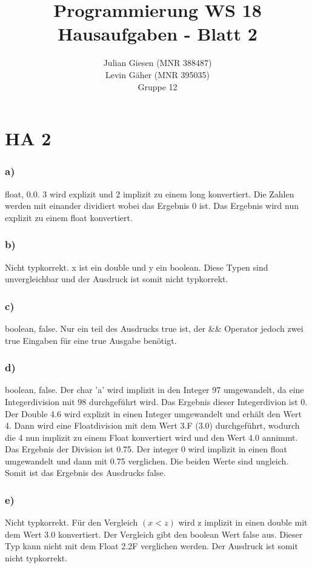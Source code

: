 \documentclass[a4paper]{article}
\title{ Programmierung WS 18 \\ Hausaufgaben - Blatt 2 }
\author{ Julian Giesen (MNR 388487) \\
Levin Gäher (MNR 395035) \\
Gruppe 12 }
\date{  }
\begin{document}
\maketitle

\section* { HA 2 }
\subsubsection*{ a) } 
float, 0.0. 3 wird explizit und 2 implizit zu einem long konvertiert. Die Zahlen werden mit einander dividiert wobei das Ergebnis 0 ist. Das Ergebnis wird nun explizit zu einem float konvertiert.
\subsubsection*{b)}
Nicht typkorrekt. x ist ein double und y ein boolean. Diese Typen sind unvergleichbar und der Ausdruck ist somit nicht typkorrekt.
\subsubsection*{c)}
boolean, false. Nur ein teil des Ausdrucks true ist, der \&\& Operator jedoch zwei true Eingaben für eine true Ausgabe benötigt.
\subsubsection*{d)}
boolean, false. Der char 'a' wird implizit in den Integer 97 umgewandelt, da eine Integerdivision mit 98 durchgeführt wird. Das Ergebnis dieser Integerdivion ist 0. Der Double 4.6 wird explizit in einen Integer umgewandelt und erhält den Wert 4. Dann wird eine Floatdivision mit dem Wert 3.F (3.0) durchgeführt, wodurch die 4 nun implizit zu einem Float konvertiert wird und den Wert 4.0 annimmt. Das Ergebnis der Division ist 0.75. Der integer 0 wird implizit in einen float umgewandelt und dann mit 0.75 verglichen. Die beiden Werte sind ungleich. Somit ist das Ergebnis des Ausdrucks false. 
\subsubsection*{e)}
Nicht typkorrekt. Für den Vergleich $(x < z)$ wird z implizit in einen double mit dem Wert 3.0 konvertiert. Der Vergleich gibt den boolean Wert false aus. Dieser Typ kann nicht mit dem Float 2.2F verglichen werden. Der Ausdruck ist somit nicht typkorrekt.
\end{document}
